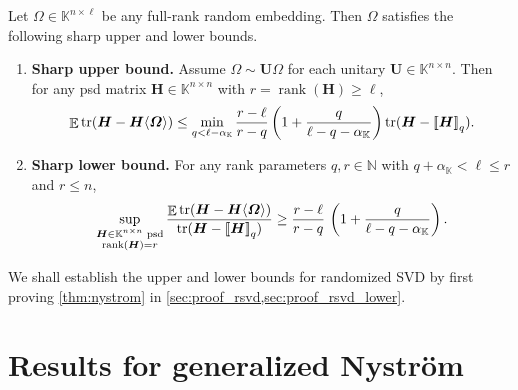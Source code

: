 \documentclass[11pt]{article}
\newcommand{\field}{\mathbb{K}}
\DeclareMathOperator{\tr}{tr}
\DeclareMathOperator{\rank}{rank}
\newcommand{\mat}[1]{\boldsymbol{#1}}
\newcommand{\lowrank}[1]{%
  \mleft[\!\mleft[ #1 \mright]\!\mright]}
\DeclareMathOperator{\expect}{\mathbb{E}}
\theoremstyle{definition}
\numberwithin{equation}{section}
\begin{document}
\begin{theorem} \label{thm:nystrom}
    Let $\mat{\varOmega} \in \field^{n \times \ell}$ be any full-rank random embedding.
    Then $\mat{\varOmega}$ satisfies the following sharp upper and lower bounds.
    \begin{enumerate}[label=(\alph*)]
        \item \label{item:nystrom-result-upper} \textbf{Sharp upper bound.} 
        Assume $\mat{\varOmega} \sim \mat{U} \mat{\varOmega}$ for each unitary $\mat{U}\in \field^{n \times n}$.
        Then for any psd matrix $\mat{H} \in \field^{n \times n}$ with $r = \rank(\mat{H}) \geq \ell$,
        \begin{equation*} 
            \expect \tr(\mat{H} - \mat{H} \langle \mat{\varOmega} \rangle) \le \min_{q < \ell - \alpha_\field} \frac{r-\ell}{r-q} \left(1 + \frac{q}{\ell - q - \alpha_\field}\right) \tr(\mat{H} - \lowrank{\mat{H}}_q).
        \end{equation*}
        \item \label{item:nystrom-result-lower} \textbf{Sharp lower bound.} 
        For any rank parameters $q,r \in \mathbb{N}$ with $q + \alpha_\field < \ell \leq r$ and $r \leq n$,
        \begin{equation*}
            \sup_{\substack{\mat{H} \in \field^{n\times n} \text{ psd} \\ \rank(\mat{H}) = r}} \frac{\expect \tr(\mat{H} - \mat{H}\langle \mat{\varOmega} \rangle)}{\tr(\mat{H} - \lowrank{\mat{H}}_q)} 
            \ge \frac{r-\ell}{r-q}\, \left(1 + \frac{q}{\ell - q - \alpha_\field}\right).
        \end{equation*}
    \end{enumerate}
    
\end{theorem}
%
\noindent We shall establish the upper and lower bounds for randomized SVD by first proving \cref{thm:nystrom} in \cref{sec:proof_rsvd,sec:proof_rsvd_lower}.

\section{Results for generalized Nystr\"om}
\label{sec:gen_nystrom}
\end{document}
